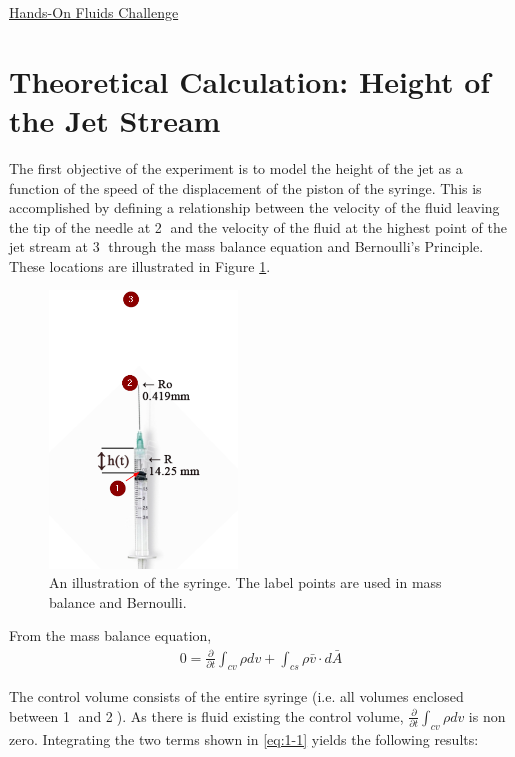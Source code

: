 \documentclass{article}
\begin{document}
\begin{center}\underline{\huge Hands-On Fluids Challenge}\end{center}

\section{Theoretical Calculation: Height of the Jet Stream}
%
The first objective of the experiment is to model the height of the jet as a function of the speed of the displacement of the piston of the syringe. This is accomplished by defining a relationship between the velocity of the fluid leaving the tip of the needle at \textcircled{2} and the velocity of the fluid at the highest point of the jet stream at \textcircled{3} through the mass balance equation and Bernoulli's Principle. These locations are illustrated in Figure \ref{fig:1}.

%
\begin{figure}[h!]
\centering
  \includegraphics[width=50mm]{Syringe.png}
  \captionsetup{justification=centering}
  \caption{An illustration of the syringe. The label points are used in mass balance and Bernoulli.}
  \label{fig:1}
\end{figure}
%
From the mass balance equation,
\begin{align*}
0= \frac{\partial}{\partial{t}} \int_{cv} \rho dv + \int_{cs} \rho \bar{v} \cdot d\bar{A} \label{eq:1-1} 
\end{align*} 

The control volume consists of the entire syringe (i.e. all volumes enclosed between \textcircled{1} and \textcircled{2}). As there is fluid existing the control volume, $\frac{\partial}{\partial{t}} \int_{cv} \rho dv$ is non zero. Integrating the two terms shown in \eqref{eq:1-1} yields the following results:
\end{document}
